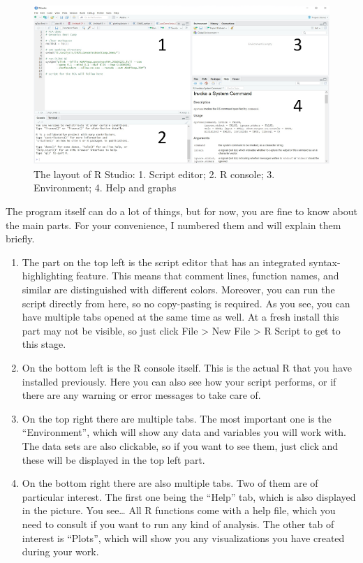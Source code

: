\documentclass[]{book}
\begin{document}
\begin{figure}
\includegraphics[width=8.68in]{images/5-1-RStudioLayout} \caption{The layout of R Studio: 1. Script editor; 2. R console; 3. Environment; 4. Help and graphs}\label{fig:fig5-1}
\end{figure}

The program itself can do a lot of things, but for now, you are fine to
know about the main parts. For your convenience, I numbered them and
will explain them briefly.

\begin{enumerate}
\def\labelenumi{\arabic{enumi})}
\item
  The part on the top left is the script editor that has an integrated
  syntax-highlighting feature. This means that comment lines, function
  names, and similar are distinguished with different colors. Moreover,
  you can run the script directly from here, so no copy-pasting is
  required. As you see, you can have multiple tabs opened at the same
  time as well. At a fresh install this part may not be visible, so just
  click File \textgreater{} New File \textgreater{} R Script to get to
  this stage.
\item
  On the bottom left is the R console itself. This is the actual R that
  you have installed previously. Here you can also see how your script
  performs, or if there are any warning or error messages to take care
  of.
\item
  On the top right there are multiple tabs. The most important one is
  the ``Environment'', which will show any data and variables you will
  work with. The data sets are also clickable, so if you want to see
  them, just click and these will be displayed in the top left part.
\item
  On the bottom right there are also multiple tabs. Two of them are of
  particular interest. The first one being the ``Help'' tab, which is
  also displayed in the picture. You see\ldots{} All R functions come
  with a help file, which you need to consult if you want to run any
  kind of analysis. The other tab of interest is ``Plots'', which will
  show you any visualizations you have created during your work.
\end{enumerate}
\end{document}
